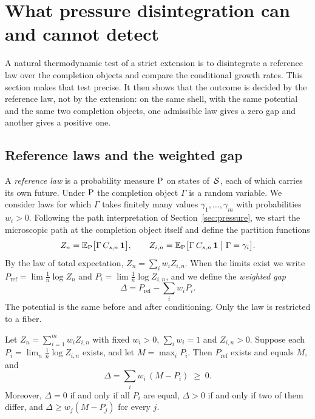 \section{What pressure disintegration can and cannot detect}\label{sec:disintegration}

A natural thermodynamic test of a strict extension is to disintegrate a reference law over the completion objects and compare the conditional growth rates. This section makes that test precise. It then shows that the outcome is decided by the reference law, not by the extension: on the same shell, with the same potential and the same two completion objects, one admissible law gives a zero gap and another gives a positive one.

\subsection{Reference laws and the weighted gap}

A \emph{reference law} is a probability measure $\mathrm{P}$ on states of~$\mathcal{S}$, each of which carries its own future. Under $\mathrm{P}$ the completion object $\Gamma$ is a random variable. We consider laws for which $\Gamma$ takes finitely many values $\gamma_1,\dots,\gamma_m$ with probabilities $w_i>0$. Following the path interpretation of Section~\ref{sec:pressure}, we start the microscopic path at the completion object itself and define the partition functions
\[
Z_n=\mathbb{E}_{\mathrm{P}}\bigl[\Gamma\,C_{s,n}\,\mathbf{1}\bigr],\qquad
Z_{i,n}=\mathbb{E}_{\mathrm{P}}\bigl[\Gamma\,C_{s,n}\,\mathbf{1}\;\big|\;\Gamma=\gamma_i\bigr].
\]
By the law of total expectation, $Z_n=\sum_iw_iZ_{i,n}$. When the limits exist we write $P_{\mathrm{ref}}=\lim\frac1n\log Z_n$ and $P_i=\lim\frac1n\log Z_{i,n}$, and we define the \emph{weighted gap}
\[
\Delta=P_{\mathrm{ref}}-\sum_iw_iP_i.
\]
The potential is the same before and after conditioning. Only the law is restricted to a fiber.

\begin{proposition}\label{prop:finite-disintegration}
Let $Z_n=\sum_{i=1}^mw_iZ_{i,n}$ with fixed $w_i>0$, $\sum_iw_i=1$ and $Z_{i,n}>0$. Suppose each $P_i=\lim_n\frac1n\log Z_{i,n}$ exists, and let $M=\max_iP_i$. Then $P_{\mathrm{ref}}$ exists and equals $M$, and
\[
\Delta=\sum_iw_i\,(M-P_i)\;\ge\;0.
\]
Moreover, $\Delta=0$ if and only if all $P_i$ are equal, $\Delta>0$ if and only if two of them differ, and $\Delta\ge w_j(M-P_j)$ for every $j$.
\end{proposition}

